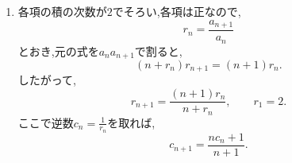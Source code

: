 \begin{enumerate}[label=\textbf{問\arabic*.},leftmargin=3.8em,format=\bookitemlink{practice-advanced}{solution}{problem}]
                $n\ge2$で総和の上端をそろえると,
                \begin{align*}
                  x_{n+1}
                    &=n+\sum_{k=1}^{n-1}(n-k+1)x_k+x_n,\\
                  x_n
                    &=(n-1)+\sum_{k=1}^{n-1}(n-k)x_k
                \end{align*}
                である.既存の各項の重みは$1$ずつ増え,新しく加わる項は$x_n$である.
                したがって差を取ると,
                \begin{align*}
                  x_{n+1}-x_n
                  &=1+\sum_{k=1}^{n-1}x_k+x_n\\
                  &=1+\sum_{k=1}^{n}x_k.
                \end{align*}
                $n=1$でも$x_2-x_1=1+x_1$が成り立つので,この関係はすべての$n\ge1$で使える.さらに隣接する式の差を取ると,
                \[
                  x_{n+2}-2x_{n+1}+x_n=x_{n+1}.
                \]
                したがって,
                \[
                  x_{n+2}-3x_{n+1}+x_n=0.
                \]
                の2根を
                \[
                  \alpha=\frac{3+\sqrt5}{2},\qquad
                  \beta=\frac{3-\sqrt5}{2}
                \]
                とすると,\, $\alpha+\beta=3$,\, $\alpha\beta=1$である.よって
                \[
                  x_{n+2}-\beta x_{n+1}
                   =\alpha(x_{n+1}-\beta x_n).
                \]
                初期値$x_1=0$,\, $x_2=1$に合う形は
                \[
                  x_n
                   =\frac{\alpha^{n-1}-\beta^{n-1}}{\alpha-\beta}
                   =\frac{\alpha^{n-1}-\beta^{n-1}}{\sqrt5}.
                \]
                この式は3項間の関係と二つの初期値を満たすため,更新の一意性から$x_n$に一致する.
                $a_n=2^{x_n}$で戻す.指数は$0,1,3,8,21,\ldots$となり,重み付き総和の差を二回取ると巨大な積を避けられた.
          \item 各項の積の次数が$2$でそろい,各項は正なので,
                \[
                  r_n=\frac{a_{n+1}}{a_n}
                \]
                とおき,元の式を$a_na_{n+1}$で割ると,
                \[
                  (n+r_n)r_{n+1}=(n+1)r_n.
                \]
                したがって,
                \[
                  r_{n+1}=\frac{(n+1)r_n}{n+r_n},
                  \qquad r_1=2.
                \]
                ここで逆数$\displaystyle c_n=\frac{1}{r_n}$を取れば,
                \[
                  c_{n+1}=\frac{nc_n+1}{n+1}.
\]
\end{enumerate}
